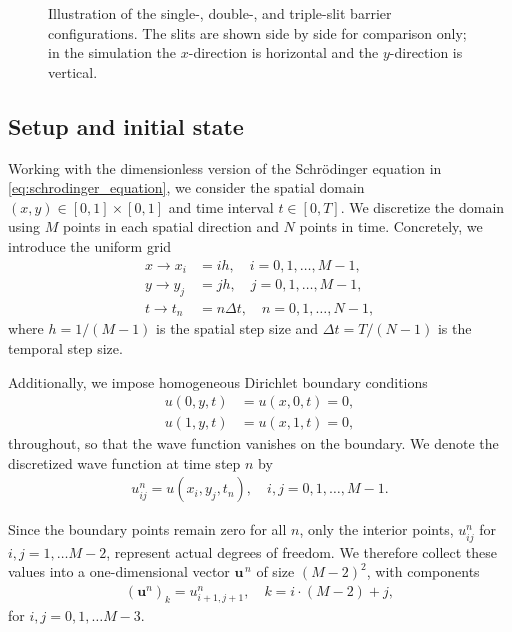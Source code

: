 \documentclass[aps,pra,reprint,amsmath,amssymb,twocolumn,preprintnumbers,superscriptaddress,10pt]{revtex4-2}
\renewcommand{\vec}[1]{\mathbf{#1}}
\begin{document}
\begin{figure}[h!]
\caption{Illustration of the single-, double-, and triple-slit barrier configurations. The slits are shown side by side for comparison only; in the simulation the \(x\)-direction is horizontal and the \(y\)-direction is vertical.}
\label{fig:slit_setup}
\end{figure}

\subsection{Setup and initial state}    \label{sec:Setup_and_initial_state}
Working with the dimensionless version of the Schrödinger equation in \eqref{eq:schrodinger_equation}, we consider the spatial domain 
$(x,y)\in[0,1]\times[0,1]$ and time interval $t\in[0,T]$. 
We discretize the domain using $M$ points in each spatial direction and $N$
points in time. Concretely, we introduce the uniform grid
\begin{subequations}    
\begin{align}
    x \rightarrow x_i &= ih, \quad  i = 0, 1, \ldots, M-1, \\
    y \rightarrow y_j &= jh, \quad  j = 0, 1, \ldots, M-1, \\
    t \rightarrow t_n &= n\Delta t, \quad  n = 0, 1, \ldots, N-1,
\end{align}
\end{subequations}
where $h=1/(M-1)$ is the spatial step size and $\Delta t=T/(N-1)$ is the temporal step size. 

Additionally, we impose homogeneous Dirichlet boundary conditions
\begin{subequations}
\begin{align}
    u(0,y,t) &= u(x,0,t) = 0, \\
    u(1,y,t) &= u(x,1,t) = 0,
\end{align}
\end{subequations}
throughout, so that the wave function vanishes on the boundary.
We denote the discretized wave function at time step \(n\) by
\begin{align}
    u_{ij}^n = u(x_{i}, y_{j}, t_n), \quad i,j = 0, 1, \ldots, M-1.
\end{align}

Since the boundary points remain zero for all \(n\), only the interior points, \(u_{ij}^{n}\) for \(i,j=1,\ldots M-2\), represent actual degrees of freedom.
We therefore collect these values into a one-dimensional vector \(\vec{u}^{\,n}\) of size \((M-2)^2\), with components
\begin{align}
    (\vec{u}^n)_k = u^n_{i+1,j+1}, \quad k = i\cdot(M-2) + j,
\end{align} 
for \(i,j=0,1,\ldots M-3\).
\end{document}
